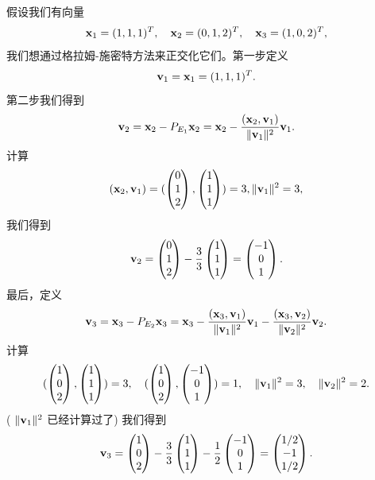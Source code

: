 假设我们有向量
$$\mathbf{x}_1 = (1, 1, 1)^T, \quad \mathbf{x}_2 = (0, 1, 2)^T, \quad \mathbf{x}_3 = (1, 0, 2)^T,$$
 我们想通过格拉姆-施密特方法来正交化它们。第一步定义
 $$\mathbf{v}_1 = \mathbf{x}_1 = (1, 1, 1)^T.$$
第二步我们得到
$$\mathbf{v}_2 = \mathbf{x}_2 - P_{E_1} \mathbf{x}_2 = \mathbf{x}_2 - \frac{(\mathbf{x}_2, \mathbf{v}_1)}{\|\mathbf{v}_1\|^2} \mathbf{v}_1.$$
计算
$$(\mathbf{x}_2, \mathbf{v}_1) = (\begin{pmatrix} 0 \\ 1 \\ 2 \end{pmatrix}, \begin{pmatrix} 1 \\ 1 \\ 1 \end{pmatrix}) = 3, \|\mathbf{v}_1\|^2 = 3,$$
我们得到
$$\mathbf{v}_2 = \begin{pmatrix} 0 \\ 1 \\ 2 \end{pmatrix} - \frac{3}{3} \begin{pmatrix} 1 \\ 1 \\ 1 \end{pmatrix} = \begin{pmatrix} -1 \\ 0 \\ 1 \end{pmatrix}.$$
最后，定义
$$\mathbf{v}_3 = \mathbf{x}_3 - P_{E_2} \mathbf{x}_3 = \mathbf{x}_3 - \frac{(\mathbf{x}_3, \mathbf{v}_1)}{\|\mathbf{v}_1\|^2} \mathbf{v}_1 - \frac{(\mathbf{x}_3, \mathbf{v}_2)}{\|\mathbf{v}_2\|^2} \mathbf{v}_2.$$
计算
$$(\begin{pmatrix} 1 \\ 0 \\ 2 \end{pmatrix}, \begin{pmatrix} 1 \\ 1 \\ 1 \end{pmatrix}) = 3,\quad (\begin{pmatrix} 1 \\ 0 \\ 2 \end{pmatrix}, \begin{pmatrix} -1 \\ 0 \\ 1 \end{pmatrix}) = 1, \quad \|\mathbf{v}_1\|^2 = 3,\quad \|\mathbf{v}_2\|^2 = 2.$$
 ( $\|\mathbf{v}_1\|^2$ 已经计算过了) 我们得到
$$\mathbf{v}_3 = \begin{pmatrix} 1 \\ 0 \\ 2 \end{pmatrix} - \frac{3}{3} \begin{pmatrix} 1 \\ 1 \\ 1 \end{pmatrix} - \frac{1}{2} \begin{pmatrix} -1 \\ 0 \\ 1 \end{pmatrix}  = \begin{pmatrix} 1/2 \\ -1 \\ 1/2 \end{pmatrix}.$$
